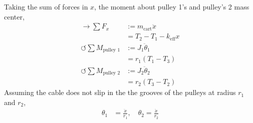 Taking the sum of forces in $x$, the moment about pulley 1's and pulley's 2 mass center, 
\begin{align}
    \rightarrow \sum F_x &:= m_{\text{cart}} \ddot{x} \nonumber \\
    &=  T_2 - T_1 - k_{\text{eff}}x \label{eq:Cart Force in x Appendix} \\
    \circlearrowleft \sum M_{\text{pulley 1}} &:= J_1 \ddot{\theta}_1 \nonumber \\
    &= r_1 (T_1 - T_3) \label{eq:Pulley 1 Moment Appendix} \\
    \circlearrowleft \sum M_{\text{pulley 2}} &:= J_2 \ddot{\theta}_2 \nonumber \\
    &= r_2 (T_3 - T_2) \label{eq:Pulley 2 Moment Appendix}
\end{align}
Assuming the cable does not slip in the the grooves of the pulleys at radius $r_1$ and $r_2$,
\begin{align}
    \theta_1 &= \frac{\ddot{x}}{r_1}, \quad \theta_2 = \frac{\ddot{x}}{r_2} \label{eq:Kinematic pure rotation for theta1 and theta2 Appendix}
\end{align}


